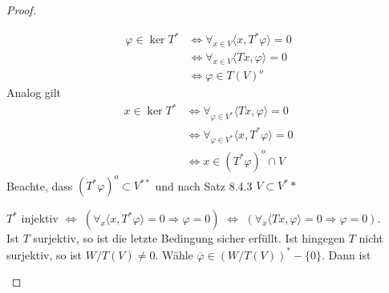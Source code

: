 \documentclass[12pt,a4paper]{article}
\theoremstyle{definition}
\theoremstyle{remark}
\renewcommand{\bar}[1]{\overline{#1}}
\begin{document}
	\begin{proof}
		\begin{proofenum}
			\item 	
				\begin{equation}
					\begin{split}
						\varphi \in \ker T^* & \Leftrightarrow \forall_{x \in V} \langle x, T^* \varphi \rangle = 0 \\
						& \Leftrightarrow \forall_{x \in V} \langle Tx, \varphi \rangle = 0 \\
						& \Leftrightarrow \varphi \in T(V)^o
					\end{split}
				\end{equation}
				Analog gilt
				\begin{equation}
					\begin{split}
						x \in \ker T^* &\Leftrightarrow \forall_{\varphi \in V^*} \langle Tx, \varphi \rangle = 0 \\
						&\Leftrightarrow \forall_{\varphi \in V^*} \langle x, T^* \varphi \rangle = 0 \\
						&\Leftrightarrow x \in (T^* \varphi)^o \cap V
					\end{split}
				\end{equation}
				Beachte, dass $(T^* \varphi)^o \subset V^{**}$ und nach Satz 8.4.3 $V \subset V^**$
			\item 
				$T^*$ injektiv $\Leftrightarrow$ $\left( \forall_x \langle x, T^* \varphi \rangle = 0 \Rightarrow \varphi = 0 \right)$ $\Leftrightarrow$ $\left( \forall_x \langle Tx, \varphi \rangle = 0 \Rightarrow \varphi = 0 \right)$. \\
				Ist $T$ surjektiv, so ist die letzte Bedingung sicher erfüllt. Ist hingegen $T$ nicht surjektiv, so ist $W/T(V) \neq 0$. Wähle $\bar{\varphi} \in (W/T(V))^* -  \{ 0 \}$. Dann ist
				\begin{center}
				\end{center}
		\end{proofenum}
	\end{proof}
\end{document}
